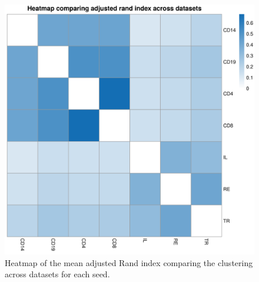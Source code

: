 \documentclass[12pt]{article} %
\begin{document}
	
	\begin{figure}[h]
		\centering
		\includegraphics[scale=0.75]{Images/Biology_data/Set_1000/All_datasets/Arandi_heatmap.png}
		\caption{Heatmap of the mean adjusted Rand index comparing the clustering across datasets for each seed.}
		\label{fig:results:cedar_2:mdi_adj_rand_ind_heatmap}
	\end{figure}
	
	
\end{document}

